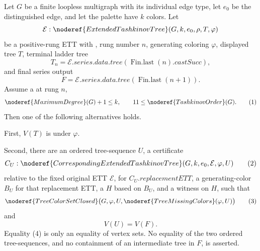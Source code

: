\begin{theorem}
Let \(G\) be a finite loopless multigraph with its individual edge type,
let \(e_0\) be the distinguished edge, and let the palette have \(k\)
colors.  Let
\[
 \mathcal E:\noderef{ExtendedTashkinovTree}(G,k,e_0,\rho,T,\varphi)
\]
be a positive-rung ETT with , rung number \(n\), generating
coloring \(\varphi\), displayed tree \(T\), terminal ladder tree
\[
 T_n=\mathcal E.\mathit{series.data.tree}
       (\operatorname{Fin.last}(n).\mathit{castSucc}),
\]
and final series output
\[
 F=\mathcal E.\mathit{series.data.tree}
       (\operatorname{Fin.last}(n+1)).
\]
Assume a  at rung \(n\),
\[
             \noderef{MaximumDegree}(G)+1\leq k,
             \qquad 11\leq \noderef{TashkinovOrder}(G).        \tag{1}
\]
Then one of the following alternatives holds.

First, \(V(T)\) is
 under \(\varphi\).

Second, there are an ordered tree-sequence \(U\), a certificate
\[
 C_U:\noderef{CorrespondingExtendedTashkinovTree}
       (G,k,e_0,\mathcal E,\varphi,U)                            \tag{2}
\]
relative to the fixed original ETT \(\mathcal E\),
 for
\(C_U.\mathit{replacementETT}\), a generating-color
 \(B_U\) for that replacement ETT, a
 \(H\) based on \(B_U\), and a
 witness on \(H\), such that
\[
 \noderef{TreeColorSetClosed}
   \bigl(G,\varphi,U,\noderef{TreeMissingColors}(\varphi,U)\bigr) \tag{3}
\]
and
\[
                       V(U)=V(F).                               \tag{4}
\]
Equality (4) is only an equality of vertex sets.  No equality of the two
ordered tree-sequences, and no containment of an intermediate tree in
\(F\), is asserted.
\end{theorem}
